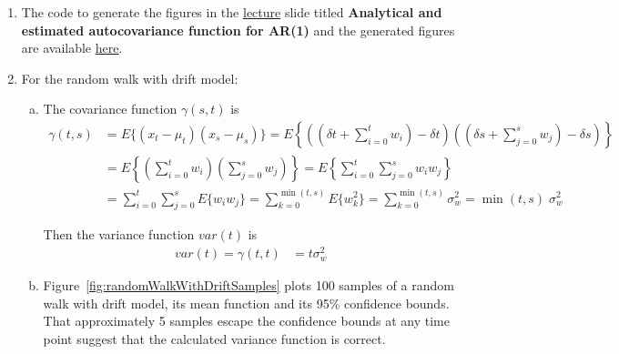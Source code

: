 \documentclass[12pt]{article}
\begin{document}
\begin{enumerate}
    \item The code to generate the figures in the
        \href{https://github.com/joacorapela/statNeuro2025/blob/master/lectures/01_temporalTimeSeriesAnalysis/temporalTimeSeriesAnalysis.pdf}{lecture}
        slide titled \textbf{Analytical and estimated autocovariance function for AR(1)} and the generated figures are available
        \href{https://joacorapela.github.io/statNeuro2025/auto_examples/01_temporalTimeSeriesAnalysis/plot_autoregressiveAutocovariance.html#sphx-glr-auto-examples-01-temporaltimeseriesanalysis-plot-autoregressiveautocovariance-py}{here}.

    \item For the random walk with drift model:

        \begin{enumerate}[(a)]

            \item The covariance function $\gamma(s, t)$ is
                \begin{align*}
                    \gamma(t,s)&=E\{(x_t-\mu_t)(x_s-\mu_s)\}=E\left\{
                        \left(\left(\delta t+\sum_{i=0}^tw_i\right)-\delta t\right)
                        \left(\left(\delta s+\sum_{j=0}^sw_j\right)-\delta s\right)
                    \right\}\\
                    &=E\left\{
                        \left(\sum_{i=0}^tw_i\right)
                        \left(\sum_{j=0}^sw_j\right)
                    \right\}
                    =E\left\{
                        \sum_{i=0}^t\sum_{j=0}^sw_iw_j
                    \right\}\\
                &=\sum_{i=0}^t\sum_{j=0}^sE\{w_iw_j\}=\sum_{k=0}^{\min(t,s)}E\{w_k^2\}=\sum_{k=0}^{\min(t,s)}\sigma_w^2=\min(t,s)\;\sigma_w^2
                \end{align*}

                Then the variance function $var(t)$ is 
                \begin{align*}
                    var(t)=\gamma(t,t)&=t\sigma_w^2
                \end{align*}

            \item Figure~\ref{fig:randomWalkWithDriftSamples} plots 100 samples
                of a random walk with drift model, its mean function and its
                95\% confidence bounds. That approximately 5 samples escape the
                confidence bounds at any time point suggest that the calculated
                variance function is correct.


\end{enumerate}
\end{enumerate}
\end{document}
